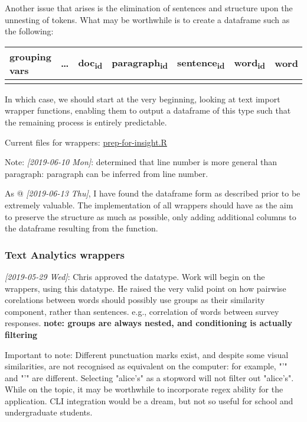 \documentclass[a4paper, 11pt]{article}
\begin{document}
Another issue that arises is the elimination of sentences and
structure upon the unnesting of tokens. What may be worthwhile is to
create a dataframe such as the following:

\begin{center}
\begin{tabular}{lllllll}
grouping vars & \ldots{} & doc\textsubscript{id} & paragraph\textsubscript{id} & sentence\textsubscript{id} & word\textsubscript{id} & word\\
\hline
 &  &  &  &  &  & \\
\end{tabular}
\end{center}

In which case, we should start at the very beginning, looking at text
import wrapper functions, enabling them to output a dataframe of this
type such that the remaining process is entirely predictable.

Current files for wrappers:
\href{file:///home/user/curr/stats-781/src/prep-for-insight.R}{prep-for-insight.R}

Note: \textit{[2019-06-10 Mon]}: determined that line number is more general
than paragraph: paragraph can be inferred from line number.

As @ \textit{[2019-06-13 Thu]}, I have found the dataframe form as described
prior to be extremely valuable. The implementation of all wrappers
should have as the aim to preserve the structure as much as possible,
only adding additional columns to the dataframe resulting from the
function.
\subsubsection{Text Analytics wrappers}
\label{sec:orgc93d500}
\textit{[2019-05-29 Wed]}: Chris approved the datatype. Work will begin on the
wrappers, using this datatype. He raised the very valid point on how
pairwise corelations between words should possibly use groups as
their similarity component, rather than sentences. e.g., correlation
of words between survey responses. \textbf{note: groups are always nested,
and conditioning is actually filtering}

Important to note: Different punctuation marks exist, and despite some
visual similarities, are not recognised as equivalent on the computer:
for example, "’" and "'" are different. Selecting "alice's" as a
stopword will not filter out "alice’s". While on the topic, it may be
worthwhile to incorporate regex ability for the application. CLI
integration would be a dream, but not so useful for school and
undergraduate students.
\end{document}
